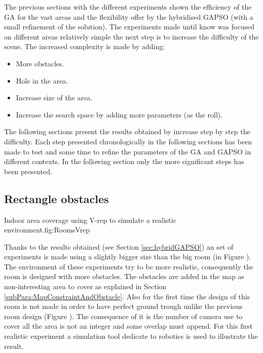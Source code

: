 The previous sections with the different experiments shown the efficiency of the GA for the vast areas and the flexibility offer by the hybridised GAPSO (with a small refinement of the solution). The experiments made until know was focused on different areas relatively simple the next step is to increase the difficulty of the scene. The increased complexity is made by adding: 
\begin{itemize}
\item More obstacles.
\item Hole in the area.
\item Increase size of the area.
\item Increase the search space by adding more parameters (as the roll). 
\end{itemize} 
The following sections present the results obtained by increase step by step the difficulty. Each step presented chronologically in the following sections has been made to test and some time to refine the parameters of the GA and GAPSO in different contexts. In the following section only the more significant steps has been presented.

	\subsection{Rectangle obstacles } \label{sec:expRectObstacle}
	\begin{mfigures}[!]{Indoor area coverage using V-rep to simulate a realistic environment.}{fig:RoomsVrep} \centering
{}
\hspace{1cm}
\hspace{1cm}

\tabsimuposeVrep
\end{mfigures}
	
	Thanks to the results obtained (see  Section \ref{sec:hybridGAPSO}) an  set of experiments is made using a slightly bigger size than the big room (in Figure ). The environment of these experiments try to be more realistic, consequently the room is designed with more obstacles. 
	The obstacles are added in the map as non-interesting area to cover as explained in Section \ref{subPara:MapConstraintAndObstacle}. Also for the first time the design of this room  is  not made in order to have perfect ground trough unlike the previous room design (Figure ). The consequence of it is the number of camera use to cover all the area is not an integer and some overlap must append.
	For this first realistic experiment a simulation tool dedicate to robotics is used to illustrate the result. 
	     
